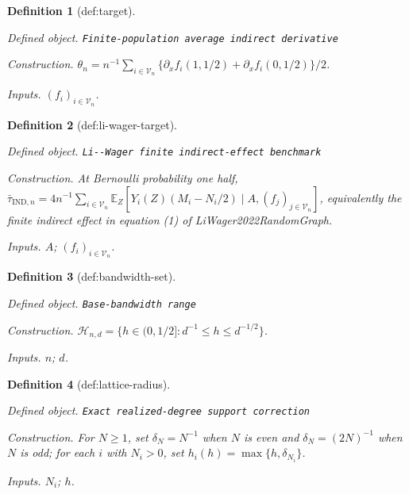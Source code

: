 \documentclass{article}
\newtheorem{definition}{Definition}
\begin{document}
\begin{definition}[def:target]\label{def:target}
\par\smallskip\noindent\emph{Defined object.} \texttt{Finite-\allowbreak{}population average indirect derivative}
\par\smallskip\noindent\emph{Construction.} \(\theta_n=n^{-1}\sum_{i\in\mathcal V_n}\{\partial_x f_i(1,1/2)+\partial_x f_i(0,1/2)\}/2\).
\par\smallskip\noindent\emph{Inputs.} \((f_i)_{i\in\mathcal V_n}\).
\end{definition}

\begin{definition}[def:li-wager-target]\label{def:li-wager-target}
\par\smallskip\noindent\emph{Defined object.} \texttt{Li-\allowbreak{}-\allowbreak{}Wager finite indirect-\allowbreak{}effect benchmark}
\par\smallskip\noindent\emph{Construction.} At Bernoulli probability one half, \(\bar\tau_{\mathrm{IND},n}=4n^{-1}\sum_{i\in\mathcal V_n}\mathbb E_Z[Y_i(Z)(M_i-N_i/2)\mid A,(f_j)_{j\in\mathcal V_n}]\), equivalently the finite indirect effect in equation (1) of LiWager2022RandomGraph.
\par\smallskip\noindent\emph{Inputs.} \(A\); \((f_i)_{i\in\mathcal V_n}\).
\end{definition}

\begin{definition}[def:bandwidth-set]\label{def:bandwidth-set}
\par\smallskip\noindent\emph{Defined object.} \texttt{Base-\allowbreak{}bandwidth range}
\par\smallskip\noindent\emph{Construction.} \(\mathcal H_{n,d}=\{h\in(0,1/2]:d^{-1}\le h\le d^{-1/2}\}\).
\par\smallskip\noindent\emph{Inputs.} \(n\); \(d\).
\end{definition}

\begin{definition}[def:lattice-radius]\label{def:lattice-radius}
\par\smallskip\noindent\emph{Defined object.} \texttt{Exact realized-\allowbreak{}degree support correction}
\par\smallskip\noindent\emph{Construction.} For \(N\ge1\), set \(\delta_N=N^{-1}\) when \(N\) is even and \(\delta_N=(2N)^{-1}\) when \(N\) is odd; for each \(i\) with \(N_i>0\), set \(h_i(h)=\max\{h,\delta_{N_i}\}\).
\par\smallskip\noindent\emph{Inputs.} \(N_i\); \(h\).
\end{definition}
\end{document}

